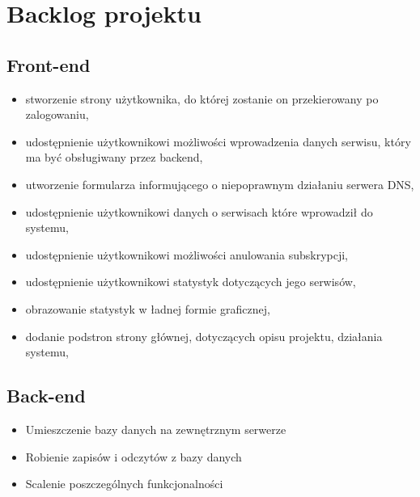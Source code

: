 \section{Backlog projektu}

\subsection*{Front-end}
\begin{itemize}
  \item stworzenie strony użytkownika, do której zostanie on przekierowany po zalogowaniu,
  \item udostępnienie użytkownikowi możliwości wprowadzenia danych serwisu, który ma być obsługiwany przez backend,
  \item utworzenie formularza informującego o niepoprawnym działaniu serwera DNS, 
  \item udostępnienie użytkownikowi danych o serwisach które wprowadził do systemu,
  \item udostępnienie użytkownikowi możliwości anulowania subskrypcji,
  \item udostępnienie użytkownikowi statystyk dotyczących jego serwisów,
  \item obrazowanie statystyk w ładnej formie graficznej,
  \item dodanie podstron strony głównej, dotyczących opisu projektu, działania systemu,
\end{itemize}

\subsection*{Back-end}
\begin{itemize}
    \item Umieszczenie bazy danych na zewnętrznym serwerze 
    \item Robienie zapisów i odczytów z bazy danych 
    \item Scalenie poszczególnych funkcjonalności 
\end{itemize}